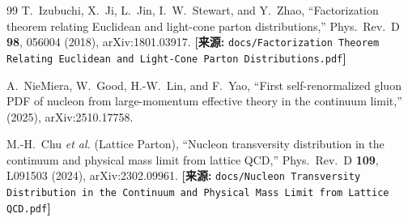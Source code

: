 \documentclass[12pt,a4paper]{ctexart}
\theoremstyle{definition}
\begin{document}
\begin{thebibliography}{99}
T.~Izubuchi, X.~Ji, L.~Jin, I.~W.~Stewart, and Y.~Zhao,
``Factorization theorem relating Euclidean and light-cone parton distributions,''
Phys.\ Rev.\ D \textbf{98}, 056004 (2018), arXiv:1801.03917.
\quad\textbf{[来源:} \texttt{docs/Factorization Theorem Relating Euclidean and Light-Cone Parton Distributions.pdf}\textbf{]}

A.~NieMiera, W.~Good, H.-W.~Lin, and F.~Yao,
``First self-renormalized gluon PDF of nucleon from large-momentum effective theory in the continuum limit,''
(2025), arXiv:2510.17758.

M.-H.~Chu \textit{et al.} (Lattice Parton),
``Nucleon transversity distribution in the continuum and physical mass limit from lattice QCD,''
Phys.\ Rev.\ D \textbf{109}, L091503 (2024), arXiv:2302.09961.
\quad\textbf{[来源:} \texttt{docs/Nucleon Transversity Distribution in the Continuum and Physical Mass Limit from Lattice QCD.pdf}\textbf{]}

\end{thebibliography}
\end{document}

